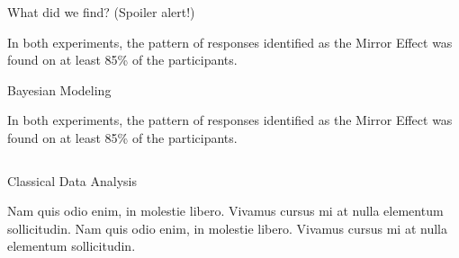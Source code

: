 \documentclass[final]{beamer}
\newlength{\onecolwid}
\newlength{\twocolwid}
\begin{document}
\begin{frame}[t]
\begin{columns}[t]
\begin{column}{\twocolwid}
\begin{columns}[t,totalwidth=\twocolwid]
\end{columns} %

\begin{alertblock}{What did we find? (Spoiler alert!)}

In both experiments, the pattern of responses identified as the Mirror Effect was found on at least 85\% of the participants.

\end{alertblock} 


\begin{alertblock}{Bayesian Modeling}

In both experiments, the pattern of responses identified as the Mirror Effect was found on at least 85\% of the participants.

\end{alertblock} 




\begin{columns}[t,totalwidth=\twocolwid] %

\begin{column}{\onecolwid} %


\begin{block}{Classical Data Analysis}

Nam quis odio enim, in molestie libero. Vivamus cursus mi at nulla elementum sollicitudin. Nam quis odio enim, in molestie libero. Vivamus cursus mi at nulla elementum sollicitudin.


\end{block}
\end{column}
\end{columns}
\end{column}
\end{columns}
\end{frame}
\end{document}
